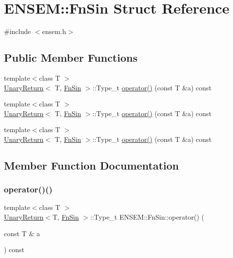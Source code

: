 \hypertarget{structENSEM_1_1FnSin}{}\section{E\+N\+S\+EM\+:\+:Fn\+Sin Struct Reference}
\label{structENSEM_1_1FnSin}


{\ttfamily \#include $<$ensem.\+h$>$}

\subsection*{Public Member Functions}
\begin{DoxyCompactItemize}
\item 
{\footnotesize template$<$class T $>$ }\\\mbox{\hyperlink{structENSEM_1_1UnaryReturn}{Unary\+Return}}$<$ T, \mbox{\hyperlink{structENSEM_1_1FnSin}{Fn\+Sin}} $>$\+::Type\+\_\+t \mbox{\hyperlink{structENSEM_1_1FnSin_aa82ed3f0ebd57960c04e240acba9184b}{operator()}} (const T \&a) const
\item 
{\footnotesize template$<$class T $>$ }\\\mbox{\hyperlink{structENSEM_1_1UnaryReturn}{Unary\+Return}}$<$ T, \mbox{\hyperlink{structENSEM_1_1FnSin}{Fn\+Sin}} $>$\+::Type\+\_\+t \mbox{\hyperlink{structENSEM_1_1FnSin_aa82ed3f0ebd57960c04e240acba9184b}{operator()}} (const T \&a) const
\item 
{\footnotesize template$<$class T $>$ }\\\mbox{\hyperlink{structENSEM_1_1UnaryReturn}{Unary\+Return}}$<$ T, \mbox{\hyperlink{structENSEM_1_1FnSin}{Fn\+Sin}} $>$\+::Type\+\_\+t \mbox{\hyperlink{structENSEM_1_1FnSin_aa82ed3f0ebd57960c04e240acba9184b}{operator()}} (const T \&a) const
\end{DoxyCompactItemize}


\subsection{Member Function Documentation}
\mbox{\label{structENSEM_1_1FnSin_aa82ed3f0ebd57960c04e240acba9184b}} 
\subsubsection{\texorpdfstring{operator()()}{operator()()}\hspace{0.1cm}{\footnotesize\ttfamily [1/3]}}
{\footnotesize\ttfamily template$<$class T $>$ \\
\mbox{\hyperlink{structENSEM_1_1UnaryReturn}{Unary\+Return}}$<$T, \mbox{\hyperlink{structENSEM_1_1FnSin}{Fn\+Sin}} $>$\+::Type\+\_\+t E\+N\+S\+E\+M\+::\+Fn\+Sin\+::operator() (\begin{DoxyParamCaption}\item[{const T \&}]{a }\end{DoxyParamCaption}) const\hspace{0.3cm}{\ttfamily [inline]}}


